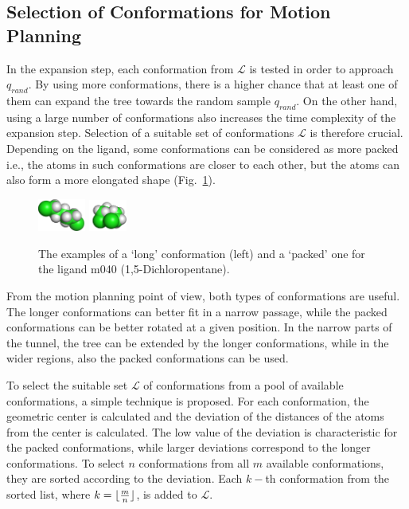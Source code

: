 \documentclass[usletter, 10pt, conference]{ieeeconf} %
\def\qrand{q_{rand}}
\def\L{\mathcal{L}}
\begin{document}
\subsection{Selection of Conformations for Motion Planning}
\label{sec::strat}

In the expansion step, each conformation from $\L$ is tested in order to approach $\qrand$.
By using more conformations, there is a higher chance that at least one of them can expand the tree towards the random sample $\qrand$.
On the other hand, using a large number of conformations also increases the time complexity of the expansion step.
Selection of a suitable set of conformations $\L$ is therefore crucial.
Depending on the ligand, some conformations can be considered as more packed i.e., the atoms in such conformations are closer to each other, but 
the atoms can also form a more elongated shape (Fig.~\ref{fig::m040c}).

\begin{figure}[bh]
\centering
\includegraphics[width=0.14\textwidth]{fig/m040-conf1} \hskip 25pt
\includegraphics[width=0.11\textwidth]{fig/m040-conf2}
\caption{\label{fig::m040c}
 The examples of a `long' conformation (left) and a `packed' one for the ligand m040 (1,5-Dichloropentane).
}
\end{figure}

From the motion planning point of view, both types of conformations are useful.
The longer conformations can better fit in a narrow passage, while the packed conformations can be better rotated at a given position.
In the narrow parts of the tunnel, the tree can be extended by the longer conformations, while in the wider regions, also the
packed conformations can be used.

To select the suitable set $\L$ of conformations from a pool of available conformations, a simple technique is proposed.  
For each conformation, the geometric center is calculated and the deviation of the distances of the atoms from the center is calculated.
The low value of the deviation is characteristic for the packed conformations, while larger deviations correspond to the longer conformations.
To select $n$ conformations from all $m$ available conformations, they are sorted according to the deviation.
Each $k-$th conformation from the sorted list, where $k=\lfloor{m\over n}\rfloor$, is added to $\L$.
\end{document}

